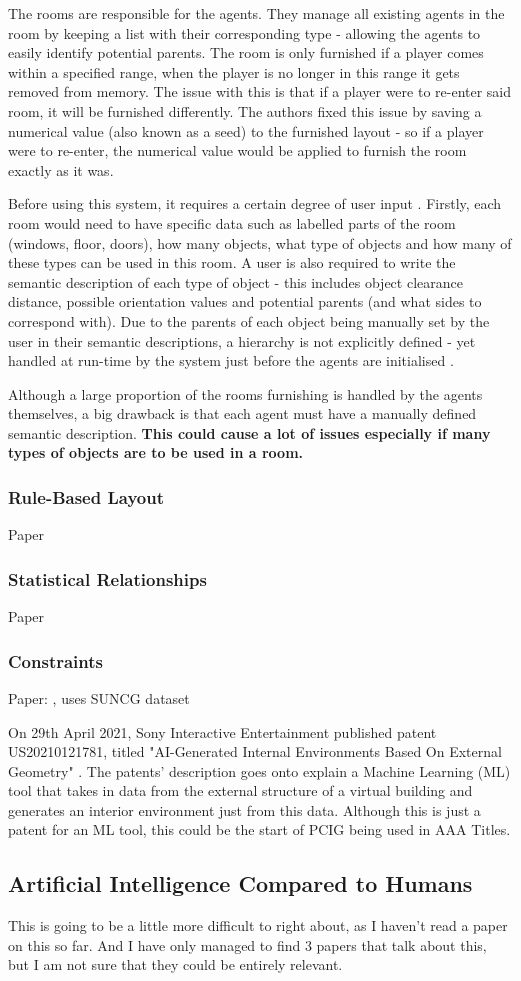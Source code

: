 The rooms are responsible for the agents. They manage all existing agents in the room by keeping a list with their corresponding type - allowing the agents to easily identify potential parents. The room is only furnished if a player comes within a specified range, when the player is no longer in this range it gets removed from memory. The issue with this is that if a player were to re-enter said room, it will be furnished differently. The authors fixed this issue by saving a numerical value (also known as a seed) to the furnished layout - so if a player were to re-enter, the numerical value would be applied to furnish the room exactly as it was.

Before using this system, it requires a certain degree of user input \cite{real-time-walkthroughs}. Firstly, each room would need to have specific data such as labelled parts of the room (windows, floor, doors), how many objects, what type of objects and how many of these types can be used in this room.
A user is also required to write the semantic description of each type of object - this includes object clearance distance, possible orientation values and potential parents (and what sides to correspond with).
Due to the parents of each object being manually set by the user in their semantic descriptions, a hierarchy is not explicitly defined - yet handled at run-time by the system just before the agents are initialised \cite{real-time-walkthroughs}.

Although a large proportion of the rooms furnishing is handled by the agents themselves, a big drawback is that each agent must have a manually defined semantic description. \textbf{This could cause a lot of issues especially if many types of objects are to be used in a room.}

\subsubsection*{Rule-Based Layout}
Paper \cite{rule-based-layout}
\subsubsection*{Statistical Relationships}
Paper \cite{make-it-home}
\subsubsection*{Constraints}
Paper: \cite{constrained-layouts}, uses SUNCG dataset \cite{suncg}

\bigskip
On 29th April 2021, Sony Interactive Entertainment published patent US20210121781, titled "AI-Generated Internal Environments Based On External Geometry" \cite{sony-patent}. The patents' description goes onto explain a Machine Learning (ML) tool that takes in data from the external structure of a virtual building and generates an interior environment just from this data. Although this is just a patent for an ML tool, this could be the start of PCIG being used in AAA Titles. 

\subsection{Artificial Intelligence Compared to Humans}
This is going to be a little more difficult to right about, as I haven't read a paper on this so far. And I have only managed to find 3 papers that talk about this, but I am not sure that they could be entirely relevant.